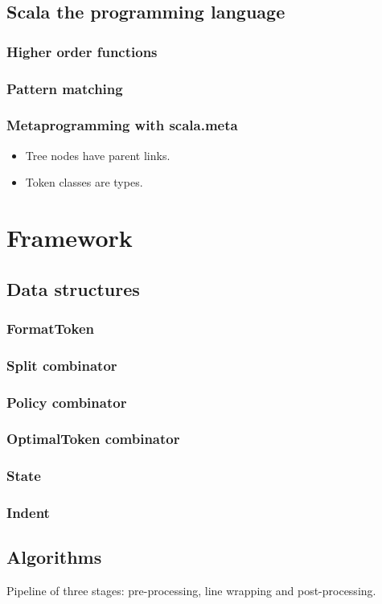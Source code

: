 \documentclass[11pt,a4paper]{article}
\begin{document}
\subsection{Scala the programming language}
\subsubsection{Higher order functions}
\subsubsection{Pattern matching}
\subsubsection{Metaprogramming with scala.meta}
\begin{itemize}
  \item Tree nodes have parent links.
  \item Token classes are types.
\end{itemize}
\section{Framework}
\subsection{Data structures}
\subsubsection{FormatToken}
\subsubsection{Split combinator}
\subsubsection{Policy combinator}
\subsubsection{OptimalToken combinator}
\subsubsection{State}
\subsubsection{Indent}
\subsection{Algorithms}
Pipeline of three stages: pre-processing, line wrapping and post-processing.
\end{document}
